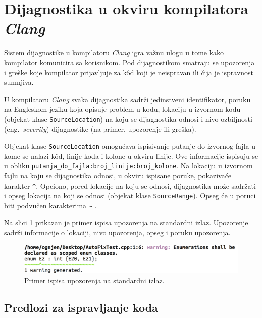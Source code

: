 \documentclass[12pt,oneside]{memoir}
\begin{document}
\section{Dijagnostika u okviru kompilatora \textit{Clang}}
\label{sec:diagnostics}

Sistem dijagnostike u kompilatoru \textit{Clang} igra va\v{z}nu ulogu u tome kako kompilator komunicira sa korisnikom. Pod dijagnostikom
smatraju se upozorenja i gre\v{s}ke koje kompilator prijavljuje za k\^{o}d koji je neispravan ili \v{c}ija je ispravnost sumnjiva. \par
U kompilatoru \textit{Clang} svaka dijagnostika sadr\v{z}i jedinstveni identifikator, poruku na Engleskom jeziku koja opisuje problem u kodu, lokaciju u izvornom kodu (objekat klase \texttt{SourceLocation}) na koju se dijagnostika odnosi i nivo ozbiljnosti (eng.~\textit{severity}) dijagnostike (na primer, upozorenje ili gre\v{s}ka). \par Objekat klase \texttt{SourceLocation} omogu\'{c}ava ispisivanje putanje do izvornog fajla u kome se nalazi k\^{o}d, linije koda i kolone u okviru linije. Ove informacije ispisuju se u obliku \texttt{putanja\_do\_fajla:broj\_linije:broj\_kolone}. Na lokaciju u izvornom fajlu na koju se dijagnostika odnosi, u okviru ispisane poruke, pokaziva\'{c}e karakter \hspace*{1mm} \texttt{\^}. Opciono, pored lokacije na koju se odnosi, dijagnostika mo\v{z}e sadr\v{z}ati i opseg lokacija na koji se odnosi (objekat klase \texttt{SourceRange}). Opseg \'{c}e u poruci biti podvu\v{c}en karakterima \hspace{2mm} \texttt{\~} \cite{CFEWebsite}.
\par
Na slici \ref{fig:warning} prikazan je primer ispisa upozorenja na standardni izlaz. Upozorenje sadr\v{z}i informacije o lokaciji, nivo upozorenja, opseg i poruku upozorenja.

\begin{figure}[!h]
\begin{center}
\includegraphics[scale=0.225]{warning.png}
\end{center}
\caption{Primer ispisa upozorenja na standardni izlaz.}
\label{fig:warning}
\end{figure}

\subsection{Predlozi za ispravljanje koda}
\end{document}
